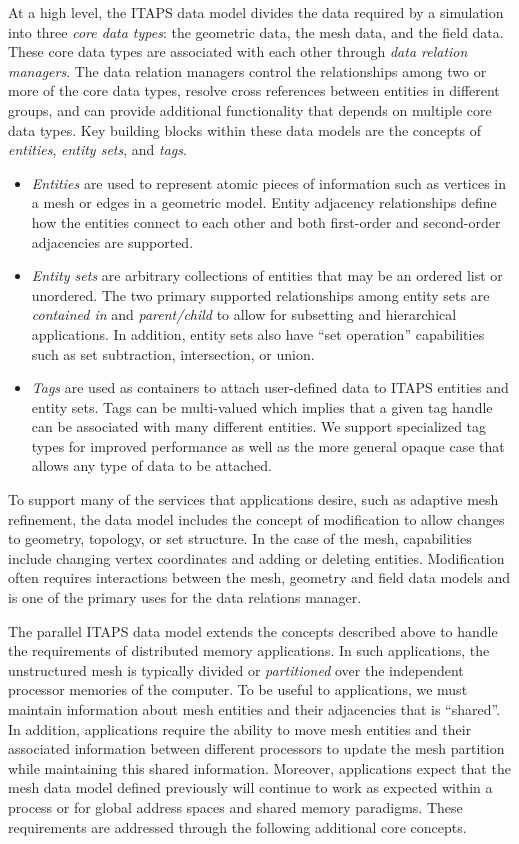 \documentclass[letterpaper]{jpconf}
\begin{document}
At a high level, the ITAPS data model divides the data required by a
simulation into three {\it core data types}: the geometric data, the
mesh data, and the field data.  These core data types are associated
with each other through {\it data relation managers}. The data
relation managers control the relationships among two or more of the
core data types, resolve cross references between entities in
different groups, and can provide additional functionality that
depends on multiple core data types.  Key building blocks within these
data models are the concepts of {\it entities}, {\it entity sets}, and
{\it tags}.
\begin{itemize}

\item {\it Entities} are used to represent atomic pieces of information
such as vertices in a mesh or edges in a geometric model.
Entity adjacency relationships define how the entities connect to
each other and both first-order and second-order adjacencies are
supported.

\item {\it Entity sets} are arbitrary collections of entities that may
be an ordered list or unordered.  The two primary supported
relationships among entity sets are {\it contained in} and {\it
parent/child} to allow for subsetting and hierarchical
applications. In addition, entity sets also have ``set operation''
capabilities such as set subtraction, intersection, or union.

\item {\it Tags} are used as containers to attach user-defined data to
ITAPS entities and entity sets.  Tags can be multi-valued which
implies that a given tag handle can be associated with many different
entities.  We support specialized tag types for improved performance
as well as the more general opaque case that allows any type of data
to be attached.
\end{itemize}
To support many of the services that applications desire, such as
adaptive mesh refinement, the data model includes the concept of
modification to allow changes to geometry, topology, or set structure.
In the case of the mesh, capabilities include changing vertex
coordinates and adding or deleting entities. Modification often
requires interactions between the mesh, geometry and field data models
and is one of the primary uses for the data relations manager.

The parallel ITAPS data model extends the concepts described above to
handle the requirements of distributed memory applications. In such
applications, the unstructured mesh is typically divided or {\it
partitioned} over the independent processor memories of the computer.
To be useful to applications, we must maintain information about mesh
entities and their adjacencies that is ``shared''.  In addition,
applications require the ability to move mesh entities and their
associated information between different processors to update the mesh
partition while maintaining this shared information.  Moreover,
applications expect that the mesh data model defined previously will
continue to work as expected within a process or for global address
spaces and shared memory paradigms.  These requirements are addressed
through the following additional core concepts.
\end{document}

